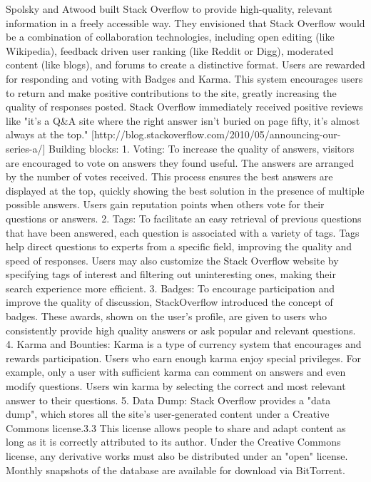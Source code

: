 Spolsky and Atwood built Stack Overflow to provide high-quality, relevant information in a freely accessible way. They envisioned that Stack Overflow would be a combination of collaboration technologies, including open editing (like Wikipedia), feedback driven user ranking (like Reddit or Digg), moderated content (like blogs), and forums to create a distinctive format.
Users are rewarded for responding and voting with Badges and Karma. This system encourages users to return and make positive contributions to the site, greatly increasing the quality of responses posted. Stack Overflow immediately received positive reviews like "it's a Q\&A site where the right answer isn't buried on page fifty, it's almost always at the top." [http://blog.stackoverflow.com/2010/05/announcing-our-series-a/]
Building blocks:
1.	Voting: To increase the quality of answers, visitors are encouraged to vote on answers they found useful. The answers are arranged by the number of votes received. This process ensures the best answers are displayed at the top, quickly showing the best solution in the presence of multiple possible answers. Users gain reputation points when others vote for their questions or answers.
2.	Tags: To facilitate an easy retrieval of previous questions that have been answered, each question is associated with a variety of tags. Tags help direct questions to experts from a specific field, improving the quality and speed of responses. Users may also customize the Stack Overflow website by specifying tags of interest and filtering out uninteresting ones, making their search experience more efficient.
3.	Badges: To encourage participation and improve the quality of discussion, StackOverflow introduced the concept of badges. These awards, shown on the user's profile, are given to users who consistently provide high quality answers or ask popular and relevant questions.
4.	Karma and Bounties: Karma is a type of currency system that encourages and rewards participation. Users who earn enough karma enjoy special privileges. For example, only a user with sufficient karma can comment on answers and even modify questions. Users win karma by selecting the correct and most relevant answer to their questions.
5.	Data Dump: Stack Overflow provides a "data dump", which stores all the site's user-generated content under a Creative Commons license.3.3 This license allows people to share and adapt content as long as it is correctly attributed to its author. Under the Creative Commons license, any derivative works must also be distributed under an "open" license. Monthly snapshots of the database are available for download via BitTorrent.
